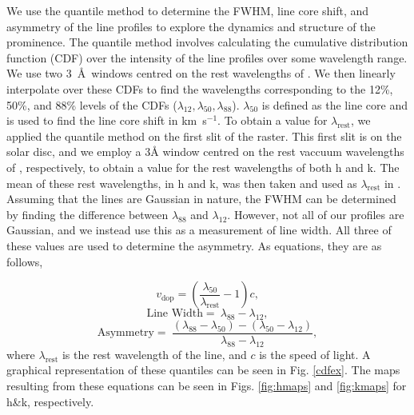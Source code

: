 We use the quantile method \citep{kerr_iris_2015,ruan_dynamic_2018} to determine the FWHM, line core shift, and asymmetry of the line profiles to explore the dynamics and structure of the prominence. The quantile method involves calculating the cumulative distribution function (CDF) over the intensity of the line profiles over some wavelength range. We use two 3~\AA\ windows centred on the rest wavelengths of \mgiihk. We then linearly interpolate over these CDFs to find the wavelengths corresponding to the 12\%, 50\%, and 88\% levels of the CDFs ($\lambda_{12}, \lambda_{50}, \lambda_{88}$). $\lambda_{50}$ is defined as the line core and is used to find the line core shift in km~s$^{-1}$. To obtain a value for $\lambda_\text{rest}$, we applied the quantile method on the first slit of the raster. This first slit is on the solar disc, and we employ a 3\AA{} window centred on the rest vaccuum wavelengths of \mgiihk{}, respectively, to obtain a value for the rest wavelengths of both h and k. The mean of these rest wavelengths, in h and k, was then taken and used as $\lambda_\text{rest}$ in . Assuming that the lines are Gaussian in nature, the FWHM can be determined by finding the difference between $\lambda_{88}$ and $\lambda_{12}$. However, not all of our profiles are Gaussian, and we instead use this as a measurement of line width. All three of these values are used to determine the asymmetry. As equations, they are as follows,

\begin{equation}
    v_\text{dop}=\left(\frac{\lambda_{50}}{\lambda_{\text{rest}}}-1\right)c,
    \label{eq:vdop}
\end{equation}
\begin{equation}
    \text{Line Width}=~\lambda_{88}-\lambda_{12},
    \label{eq:fwhm}
\end{equation}
\begin{equation}
    \text{Asymmetry}=~\frac{\left(\lambda_{88}-\lambda_{50}\right)-\left(\lambda_{50}-\lambda_{12}\right)}{\lambda_{88}-\lambda_{12}},
    \label{eq:asym}
\end{equation}
where $\lambda_{\text{rest}}$ is the rest wavelength of the line, and $c$ is the speed of light. A graphical representation of these quantiles can be seen in Fig. \ref{cdfex}. The maps resulting from these equations can be seen in Figs. \ref{fig:hmaps} and \ref{fig:kmaps} for h\&k, respectively.
 

